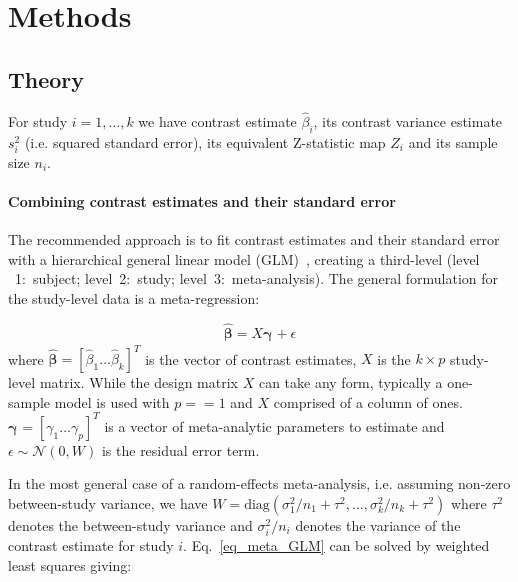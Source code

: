 \documentclass[preprint]{elsarticle}
\newcommand{\effectvector}{\hat\beta}
\newcommand{\effect}[1][i]{\effectvector_{#1}}
\newcommand{\vareffect}[1][i]{s^2_{#1}}
\newcommand{\nStudies}{k}
\newcommand{\studyidx}{i}
\newcommand{\metaanalyticeffects}{\vec{\metaanalyticeffect[]}}
\newcommand{\metaanalyticeffect}[1][i]{\gamma_{#1}}
\newcommand{\nMetaAnalyticEffects}{p}
\newcommand{\varBetween}{\tau^2}
\newcommand{\nSubjects}[1][i]{n_{#1}}
\newcommand{\varWithinCon}[1][i]{\sigma^2_{#1} / \nSubjects[#1]}
\newcommand{\transpose}{^T}
\renewcommand{\vec}[1]{\boldsymbol{\mathbf{#1}}}
\begin{document}
\section{Methods}\label{sec:methods}


\subsection{Theory}
For study $\studyidx=1,\ldots,\nStudies$ we have contrast estimate $\effect$, its contrast variance estimate $\vareffect$ (i.e. squared standard error), its equivalent Z-statistic map $Z_i$ and its sample size $n_i$.  

\paragraph{Combining contrast estimates and their standard error}

The recommended approach is to fit contrast estimates and their standard error with a hierarchical general linear model (GLM)~\cite{Cummings2004}, creating a third-level (level ~1:~subject; level~2:~study; level~3:~meta-analysis). The general formulation for the study-level data is a meta-regression:

\begin{equation}
	\vec{\effectvector} = X \metaanalyticeffects + \epsilon
	\label{eq_meta_GLM}
\end{equation}
where $\vec{\effectvector} = [\effect[1] \ldots \effect[\nStudies] ]\transpose$ is the vector of contrast estimates, $X$ is the $\nStudies \times \nMetaAnalyticEffects$ study-level matrix. While the design matrix $X$ can take any form, typically a one-sample model is used with $\nMetaAnalyticEffects==1$ and $X$ comprised of a column of ones. $\metaanalyticeffects  = [\metaanalyticeffect[1] \ldots \metaanalyticeffect[\nMetaAnalyticEffects] ]\transpose$ is a vector of meta-analytic parameters to estimate and $\epsilon \sim \mathcal{N}(0,W)$ is the residual error term. 

In the most general case of a random-effects meta-analysis, i.e. assuming non-zero between-study variance, we have $W = \mathrm{diag}( \varWithinCon[1] + \varBetween, \ldots ,\varWithinCon[\nStudies] + \varBetween )$ where $\varBetween$ denotes the between-study variance and $\varWithinCon$ denotes the variance of the contrast estimate for study $i$. Eq.~\eqref{eq_meta_GLM} can be solved by weighted least squares giving:
\end{document}
